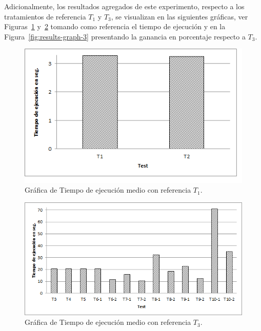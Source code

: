 \documentclass[a4paper,final,11pt,fleqn,twoside]{book}  %
\begin{document}
Adicionalmente, los resultados agregados de este experimento, respecto a los tratamientos de referencia $T_1$ y $T_3$, 
se visualizan en las siguientes gráficas, ver Figuras~\ref{fig:results-graph-1} y~\ref{fig:results-graph-2} 
tomando como referencia el tiempo de ejecución y en la Figura~\ref{fig:results-graph-3} presentando la ganancia en porcentaje respecto a $T_3$.

\begin{figure}[!htb]
\centering
	\includegraphics[width=12cm]{./images/phd/experimentation/t1-t2-tiempo}
\caption{Gráfica de Tiempo de ejecución medio con referencia $T_1$.}
\label{fig:results-graph-1}
\end{figure}

\begin{figure}[!htb]
\centering
	\includegraphics[width=14cm]{./images/phd/experimentation/t3-t10-tiempo}
\caption{Gráfica de Tiempo de ejecución medio con referencia $T_3$.}
\label{fig:results-graph-2}
\end{figure}
\end{document}
